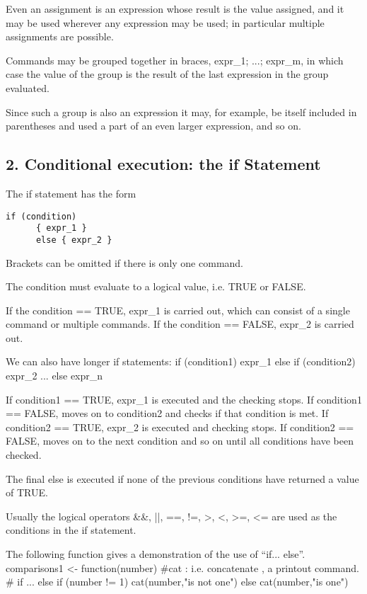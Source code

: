 Even an assignment is an expression whose result is the value assigned, and it may be used wherever any expression may be used; in particular multiple assignments are possible. 

Commands may be grouped together in braces, {expr_1; ...; expr_m}, in which case the value of the group is the result of the last expression in the group evaluated. 

Since such a group is also an expression it may, for example, be itself included in parentheses and used a part of an even larger expression, and so on.  

\subsection*{2.	Conditional execution: the if Statement}

The if statement has the form 

\begin{verbatim}
if (condition)
      { expr_1 }
      else { expr_2 }
\end{verbatim}
Brackets can be omitted if there is only one command. 

The condition must evaluate to a logical value, i.e. TRUE or FALSE. 

If the condition == TRUE, expr_1 is carried out, which can consist of a single command or multiple commands. If the condition == FALSE, expr_2 is carried out.

We can also have longer if statements:
if (condition1)
  {expr_1}
  else if (condition2)
     {expr_2}
     ...
     else {expr_n}


If condition1 == TRUE, expr_1 is executed and the checking 
stops. If condition1 == FALSE, moves on to condition2 and checks if that condition is met. 
If condition2 == TRUE, expr_2 is executed and checking stops. If condition2 == FALSE, moves on to the next condition and so on until all conditions have been checked.

The final else is executed if none of the previous conditions have returned a value of TRUE.

Usually the logical operators &&, ||, ==, !=, >, <, >=, <= are used
as the conditions in the if statement.

The following function gives a demonstration of the use of “if... else”.
comparisons1 <- function(number)
#cat :  i.e. concatenate ,  a printout command.
   {
   # if ... else
   if (number != 1)
       {
       cat(number,"is not one\n")
       }
    else
       {
       cat(number,"is one\n")
       }
    }


